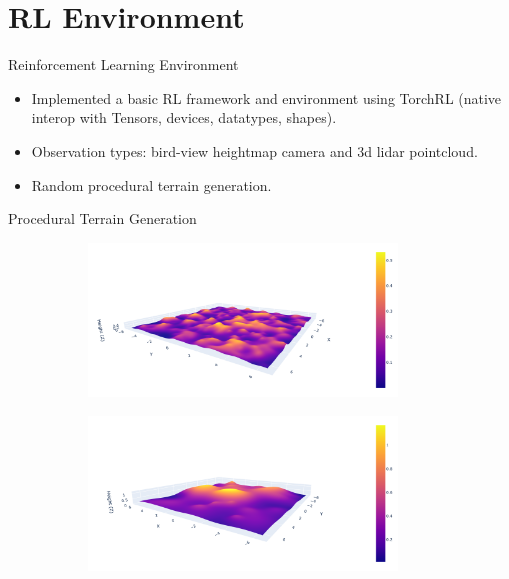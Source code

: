 \documentclass[12pt]{beamer}
\begin{document}
\section{RL Environment}
\begin{frame}{Reinforcement Learning Environment}
    \begin{itemize}
        \item Implemented a basic RL framework and environment using TorchRL (native interop with Tensors, devices, datatypes, shapes).
        \item Observation types: bird-view heightmap camera and 3d lidar pointcloud.
        \item Random procedural terrain generation.
    \end{itemize}
\end{frame}

\begin{frame}{Procedural Terrain Generation}
  \centering
  \vspace{-0.2cm}
  \begin{figure}[H]
    \begin{subfigure}[t]{0.6\textwidth}
      \includegraphics[width=0.9\textwidth]{fig/rough_terrain.png}
    \end{subfigure}

    \begin{subfigure}[t]{0.6\textwidth}
      \includegraphics[width=0.9\textwidth]{fig/smooth_terrain.png}
    \end{subfigure}
  \end{figure}
\end{frame}
\end{document}
